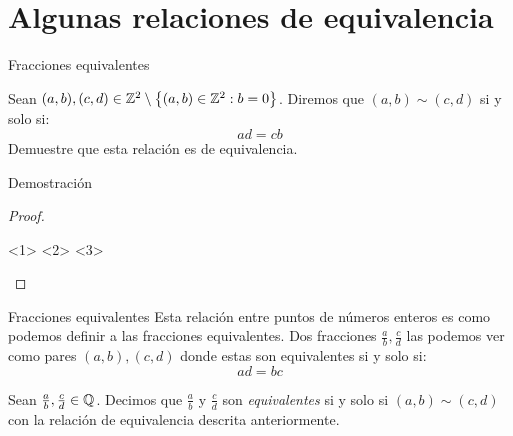 \section{Algunas relaciones de equivalencia}
\begin{frame}{Fracciones equivalentes}
	\begin{exercise}
		Sean $ (a, b), (c, d)\in\zmath[2]\setminus\set{(a, b)\in\zmath[2]: b = 0} $. Diremos que $ (a, b)\sim(c, d) $ si y solo si:
		\[ ad = cb \]
		Demuestre que esta relación es de equivalencia.
	\end{exercise}
\end{frame}
\begin{frame}{Demostración}
	\begin{proof}
		\begin{itemize}
			<1>
			<2>
		<3>
		\end{itemize}
	\end{proof}
\end{frame}
\begin{frame}{Fracciones equivalentes}
	Esta relación entre puntos de números enteros es como podemos definir a las fracciones equivalentes. Dos fracciones $ \frac{a}{b}, \frac{c}{d} $ las podemos ver como pares $ (a, b), (c, d) $ donde estas son equivalentes si y solo si:
	\[ ad = bc \]
	\begin{mdefinition}
		Sean $ \frac{a}{b}, \frac{c}{d}\in\qmath $. Decimos que $ \frac{a}{b} $ y $ \frac{c}{d} $ son \emph{equivalentes} si y solo si $ (a, b)\sim(c, d) $ con la relación de equivalencia descrita anteriormente.
	\end{mdefinition}
\end{frame}
